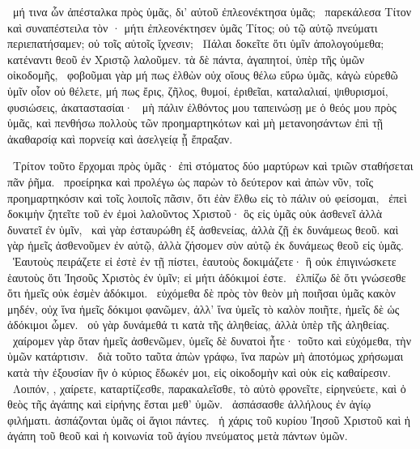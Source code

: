 ~μή τινα ὧν ἀπέσταλκα πρὸς ὑμᾶς, δι’ αὐτοῦ ἐπλεονέκτησα ὑμᾶς;
~παρεκάλεσα Τίτον καὶ συναπέστειλα τὸν · μήτι ἐπλεονέκτησεν ὑμᾶς Τίτος; οὐ τῷ αὐτῷ πνεύματι περιεπατήσαμεν; οὐ τοῖς αὐτοῖς ἴχνεσιν;
~Πάλαι δοκεῖτε ὅτι ὑμῖν ἀπολογούμεθα; κατέναντι θεοῦ ἐν Χριστῷ λαλοῦμεν. τὰ δὲ πάντα, ἀγαπητοί, ὑπὲρ τῆς ὑμῶν οἰκοδομῆς,
~φοβοῦμαι γὰρ μή πως ἐλθὼν οὐχ οἵους θέλω εὕρω ὑμᾶς, κἀγὼ εὑρεθῶ ὑμῖν οἷον οὐ θέλετε, μή πως ἔρις, ζῆλος, θυμοί, ἐριθεῖαι, καταλαλιαί, ψιθυρισμοί, φυσιώσεις, ἀκαταστασίαι·
~μὴ πάλιν ἐλθόντος μου ταπεινώσῃ με ὁ θεός μου πρὸς ὑμᾶς, καὶ πενθήσω πολλοὺς τῶν προημαρτηκότων καὶ μὴ μετανοησάντων ἐπὶ τῇ ἀκαθαρσίᾳ καὶ πορνείᾳ καὶ ἀσελγείᾳ ᾗ ἔπραξαν.

~Τρίτον τοῦτο ἔρχομαι πρὸς ὑμᾶς· ἐπὶ στόματος δύο μαρτύρων καὶ τριῶν σταθήσεται πᾶν ῥῆμα.
~προείρηκα καὶ προλέγω ὡς παρὼν τὸ δεύτερον καὶ ἀπὼν νῦν, τοῖς προημαρτηκόσιν καὶ τοῖς λοιποῖς πᾶσιν, ὅτι ἐὰν ἔλθω εἰς τὸ πάλιν οὐ φείσομαι,
~ἐπεὶ δοκιμὴν ζητεῖτε τοῦ ἐν ἐμοὶ λαλοῦντος Χριστοῦ· ὃς εἰς ὑμᾶς οὐκ ἀσθενεῖ ἀλλὰ δυνατεῖ ἐν ὑμῖν,
~καὶ γὰρ ἐσταυρώθη ἐξ ἀσθενείας, ἀλλὰ ζῇ ἐκ δυνάμεως θεοῦ. καὶ γὰρ ἡμεῖς ἀσθενοῦμεν ἐν αὐτῷ, ἀλλὰ ζήσομεν σὺν αὐτῷ ἐκ δυνάμεως θεοῦ εἰς ὑμᾶς.
~Ἑαυτοὺς πειράζετε εἰ ἐστὲ ἐν τῇ πίστει, ἑαυτοὺς δοκιμάζετε· ἢ οὐκ ἐπιγινώσκετε ἑαυτοὺς ὅτι Ἰησοῦς Χριστὸς ἐν ὑμῖν; εἰ μήτι ἀδόκιμοί ἐστε.
~ἐλπίζω δὲ ὅτι γνώσεσθε ὅτι ἡμεῖς οὐκ ἐσμὲν ἀδόκιμοι.
~εὐχόμεθα δὲ πρὸς τὸν θεὸν μὴ ποιῆσαι ὑμᾶς κακὸν μηδέν, οὐχ ἵνα ἡμεῖς δόκιμοι φανῶμεν, ἀλλ’ ἵνα ὑμεῖς τὸ καλὸν ποιῆτε, ἡμεῖς δὲ ὡς ἀδόκιμοι ὦμεν.
~οὐ γὰρ δυνάμεθά τι κατὰ τῆς ἀληθείας, ἀλλὰ ὑπὲρ τῆς ἀληθείας.
~χαίρομεν γὰρ ὅταν ἡμεῖς ἀσθενῶμεν, ὑμεῖς δὲ δυνατοὶ ἦτε· τοῦτο καὶ εὐχόμεθα, τὴν ὑμῶν κατάρτισιν.
~διὰ τοῦτο ταῦτα ἀπὼν γράφω, ἵνα παρὼν μὴ ἀποτόμως χρήσωμαι κατὰ τὴν ἐξουσίαν ἣν ὁ κύριος ἔδωκέν μοι, εἰς οἰκοδομὴν καὶ οὐκ εἰς καθαίρεσιν.
~Λοιπόν, , χαίρετε, καταρτίζεσθε, παρακαλεῖσθε, τὸ αὐτὸ φρονεῖτε, εἰρηνεύετε, καὶ ὁ θεὸς τῆς ἀγάπης καὶ εἰρήνης ἔσται μεθ’ ὑμῶν.
~ἀσπάσασθε ἀλλήλους ἐν ἁγίῳ φιλήματι. ἀσπάζονται ὑμᾶς οἱ ἅγιοι πάντες.
~ἡ χάρις τοῦ κυρίου Ἰησοῦ Χριστοῦ καὶ ἡ ἀγάπη τοῦ θεοῦ καὶ ἡ κοινωνία τοῦ ἁγίου πνεύματος μετὰ πάντων ὑμῶν.


